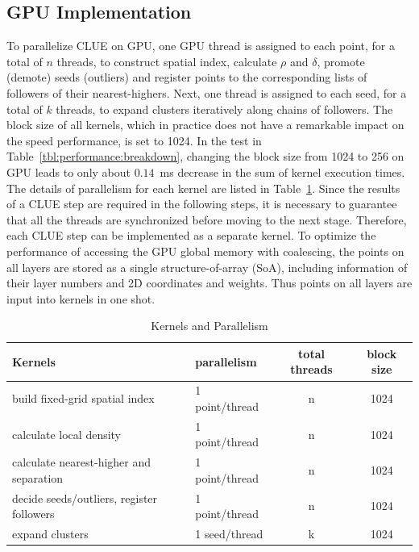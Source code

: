 \subsection{GPU Implementation}
\label{sec:implementation}

 To parallelize CLUE on GPU, one GPU thread is assigned to each point, for a total of $n$ threads, to construct spatial index, calculate $\rho$ and $\delta$, promote (demote) seeds (outliers) and register points to the corresponding lists of followers of their nearest-highers. Next, one thread is assigned to each seed, for a total of $k$ threads, to expand clusters iteratively along chains of followers. The block size of all kernels, which in practice does not have a remarkable impact on the speed performance, is set to 1024. In the test in Table~\ref{tbl:performance:breakdown}, changing the block size from 1024 to 256 on GPU leads to only about $0.14$~ms decrease in the sum of kernel execution times. The details of parallelism for each kernel are listed in Table~\ref{tbl:implementation:parallelism}. Since the results of a CLUE step are required in the following steps, it is necessary to guarantee that all the threads are synchronized before moving to the next stage. Therefore, each CLUE step can be implemented as a separate kernel. To optimize the performance of accessing the GPU global memory with coalescing, the points on all layers are stored as a single structure-of-array (SoA), including information of their layer numbers and 2D coordinates and weights. Thus points on all layers are input into kernels in one shot.


\begin{table}[t]
    \renewcommand{\arraystretch}{1.25}
    \caption{Kernels and Parallelism}
    \centering
    \begin{tabular}{l|l|c|c}
        \hline
        Kernels                                  & parallelism    & total threads & block size \\
        \hline
        build fixed-grid spatial index           & 1 point/thread & n             & 1024 \\
        calculate local density                  & 1 point/thread & n             & 1024 \\
        calculate nearest-higher and separation  & 1 point/thread & n             & 1024 \\
        decide seeds/outliers, register followers& 1 point/thread & n             & 1024 \\
        expand clusters                          & 1 seed/thread  & k             & 1024 \\
        \hline
    \end{tabular} 
    
    \label{tbl:implementation:parallelism}
\end{table}


